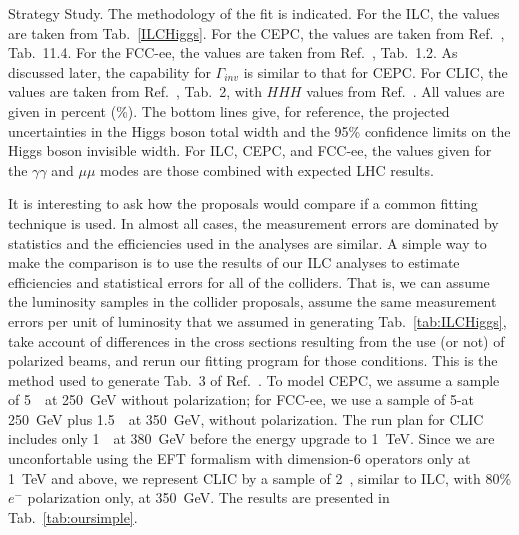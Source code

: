 \begin{table}[!htbp]
{  Strategy Study.  The methodology of the fit is indicated. 
 For the ILC, the  values are taken from
  Tab.~\ref{ILCHiggs}.    For the CEPC, the values are taken from
  Ref.~\cite{CEPCStudyGroup:2018ghi}, Tab.~11.4.  For the FCC-ee, the values are taken
  from Ref.~\cite{Benedikt:2018qee}, Tab.~1.2. As discussed later,
  the capability for $\Gamma_{inv}$  is similar to that for CEPC. 
 For CLIC, the values are taken from 
Ref.~\cite{Charles:2018vfv}, Tab.~2, with $HHH$ values from
Ref.~\cite{Roloff:2019crr}.
  All values
  are given in percent (\%). The
  bottom lines give, for reference, the projected uncertainties in the
  Higgs boson total width and the 95\% confidence limits on the Higgs
  boson invisible width.  For  ILC, CEPC, and FCC-ee, the 
 values given for the $\gamma\gamma$ and $\mu\mu$ modes are those
 combined with expected
LHC results.}
\end{table}



It is interesting to ask how the proposals would compare if a common
fitting technique is used. In almost all cases, the measurement errors
are dominated by statistics and the efficiencies used in the analyses
are similar.  A simple way to make the comparison is  to use
the results of our ILC analyses to estimate efficiencies and
statistical errors for all of the colliders.  That is, we can  assume
the luminosity samples in the collider proposals, assume the same
measurement errors per unit of luminosity that we assumed in
generating Tab.~\ref{tab:ILCHiggs},  take account of differences in
the cross sections resulting from the use (or not) of polarized beams,
and rerun our fitting  program for those conditions.   This is the
method used to generate 
Tab.~3 of Ref.~\cite{Barklow:2017suo}.  To model CEPC, we assume
 a sample of  5~\iab\ at 250~GeV without polarization; for 
FCC-ee, we use a sample of 5-\iab at 250~GeV plus 1.5~\iab\ at 350~GeV,
without polarization.  The run plan for CLIC includes only 1~\iab\ at
380~GeV before the energy upgrade to 1~TeV.  Since we are
unconfortable using the EFT formalism
 with dimension-6 operators only at 1~TeV and above, we represent CLIC by a sample of
2~\iab, similar to ILC, with 80\% $e^-$ polarization only, at 350~GeV.  
The results are presented in Tab.~\ref{tab:oursimple}.  


